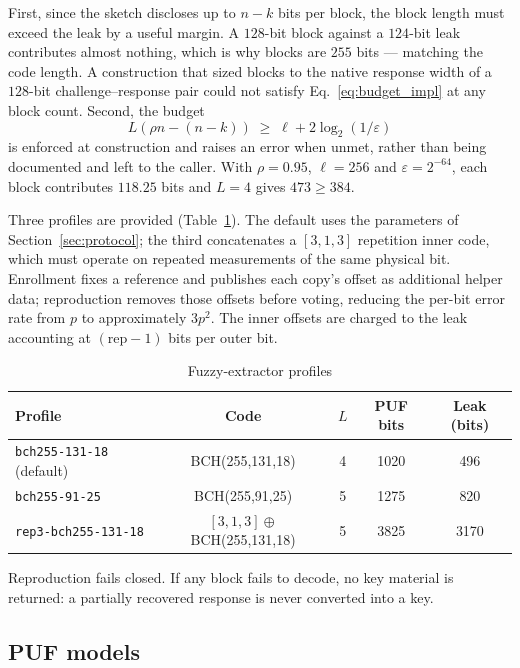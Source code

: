 \documentclass[11pt,a4paper]{article}
\begin{document}
First, since the sketch discloses up to $n-k$ bits per block, the block length
must exceed the leak by a useful margin. A $128$-bit block against a $124$-bit
leak contributes almost nothing, which is why blocks are $255$ bits --- matching
the code length. A construction that sized blocks to the native response width of
a $128$-bit challenge--response pair could not satisfy Eq.~\eqref{eq:budget_impl}
at any block count.
Second, the budget
%
\begin{equation}
L\left(\rho n - (n-k)\right) \;\ge\; \ell + 2\log_2(1/\varepsilon)
\label{eq:budget_impl}
\end{equation}
%
is enforced at construction and raises an error when unmet, rather than being
documented and left to the caller. With $\rho = 0.95$, $\ell = 256$ and
$\varepsilon = 2^{-64}$, each block contributes $118.25$ bits and $L=4$ gives
$473 \ge 384$.

Three profiles are provided (Table~\ref{tab:fe_profiles}). The default uses the
parameters of Section~\ref{sec:protocol}; the third concatenates a $[3,1,3]$
repetition inner code, which must operate on repeated measurements of the same
physical bit. Enrollment fixes a reference and publishes each copy's offset as
additional helper data; reproduction removes those offsets before voting, reducing
the per-bit error rate from $p$ to approximately $3p^2$. The inner offsets are
charged to the leak accounting at $(\mathrm{rep}-1)$ bits per outer bit.

\begin{table}[H]
\centering
\caption{Fuzzy-extractor profiles}
\label{tab:fe_profiles}
\small
\begin{tabular}{@{}lcccc@{}}
\toprule
\textbf{Profile} & \textbf{Code} & \textbf{$L$} & \textbf{PUF bits} & \textbf{Leak (bits)} \\
\midrule
\texttt{bch255-131-18} (default) & BCH(255,131,18) & 4 & 1020 & 496 \\
\texttt{bch255-91-25} & BCH(255,91,25) & 5 & 1275 & 820 \\
\texttt{rep3-bch255-131-18} & $[3,1,3]\oplus$BCH(255,131,18) & 5 & 3825 & 3170 \\
\bottomrule
\end{tabular}
\end{table}

Reproduction fails closed. If any block fails to decode, no key material is
returned: a partially recovered response is never converted into a key.

\subsection{PUF models}
\end{document}
